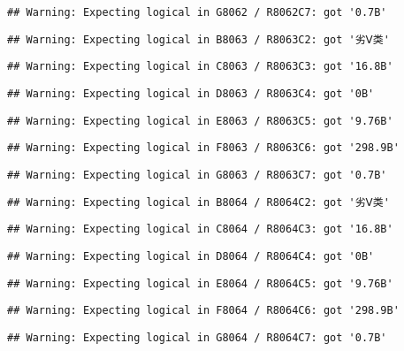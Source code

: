 \documentclass[
]{article}
\begin{document}
\begin{verbatim}
## Warning: Expecting logical in G8062 / R8062C7: got '0.7B'
\end{verbatim}

\begin{verbatim}
## Warning: Expecting logical in B8063 / R8063C2: got '劣Ⅴ类'
\end{verbatim}

\begin{verbatim}
## Warning: Expecting logical in C8063 / R8063C3: got '16.8B'
\end{verbatim}

\begin{verbatim}
## Warning: Expecting logical in D8063 / R8063C4: got '0B'
\end{verbatim}

\begin{verbatim}
## Warning: Expecting logical in E8063 / R8063C5: got '9.76B'
\end{verbatim}

\begin{verbatim}
## Warning: Expecting logical in F8063 / R8063C6: got '298.9B'
\end{verbatim}

\begin{verbatim}
## Warning: Expecting logical in G8063 / R8063C7: got '0.7B'
\end{verbatim}

\begin{verbatim}
## Warning: Expecting logical in B8064 / R8064C2: got '劣Ⅴ类'
\end{verbatim}

\begin{verbatim}
## Warning: Expecting logical in C8064 / R8064C3: got '16.8B'
\end{verbatim}

\begin{verbatim}
## Warning: Expecting logical in D8064 / R8064C4: got '0B'
\end{verbatim}

\begin{verbatim}
## Warning: Expecting logical in E8064 / R8064C5: got '9.76B'
\end{verbatim}

\begin{verbatim}
## Warning: Expecting logical in F8064 / R8064C6: got '298.9B'
\end{verbatim}

\begin{verbatim}
## Warning: Expecting logical in G8064 / R8064C7: got '0.7B'
\end{verbatim}
\end{document}
